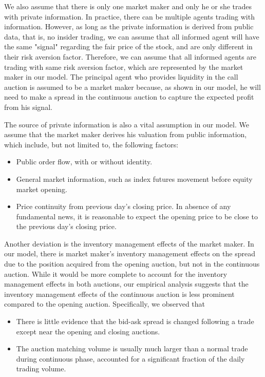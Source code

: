 We also assume that there is only one market maker and only he or she trades with private information. In practice, there can be multiple agents trading with information. However, as long as the private information is derived from public data, that is, no insider trading, we can assume that all informed agent will have the same "signal" regarding the fair price of the stock, and are only different in their risk aversion factor. Therefore, we can assume that all informed agents are trading with same risk aversion factor, which are represented by the market maker in our model. The principal agent who provides liquidity in the call auction is assumed to be a market maker because, as shown in our model, he will need to make a spread in the continuous auction to capture the expected profit from his signal.

The source of private information is also a vital assumption in our model. We assume that the market maker derives his valuation from public information, which include, but not limited to, the following factors:

\begin{itemize}
  \item Public order flow, with or without identity.
  \item General market information, such as index futures movement before equity market opening.
  \item Price continuity from previous day's closing price. In absence of any fundamental news, it is reasonable to expect the opening price to be close to the previous day's closing price.
\end{itemize}

Another deviation is the inventory management effects of the market maker. In our model, there is market maker's inventory management effects on the spread due to the position acquired from the opening auction, but not in the continuous auction. While it would be more complete to account for the inventory management effects in both auctions, our empirical analysis suggests that the inventory management effects of the continuous auction is less prominent compared to the opening auction. Specifically, we observed that

\begin{itemize}
  \item There is little evidence that the bid-ask spread is changed following a trade except near the opening and closing auctions.
  \item The auction matching volume is usually much larger than a normal trade during continuous phase, accounted for a significant fraction of the daily trading volume.
\end{itemize}

